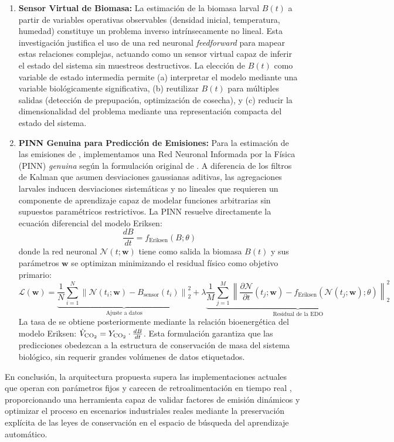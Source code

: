 \begin{enumerate}
    \item \textbf{Sensor Virtual de Biomasa:} La estimación de la biomasa larval $B(t)$ a partir de variables operativas observables (densidad inicial, temperatura, humedad) constituye un problema inverso intrínsecamente no lineal. Esta investigación justifica el uso de una red neuronal \textit{feedforward} para mapear estas relaciones complejas, actuando como un sensor virtual capaz de inferir el estado del sistema sin muestreos destructivos. La elección de $B(t)$ como variable de estado intermedia permite (a) interpretar el modelo mediante una variable biológicamente significativa, (b) reutilizar $B(t)$ para múltiples salidas (detección de prepupación, optimización de cosecha), y (c) reducir la dimensionalidad del problema mediante una representación compacta del estado del sistema.
    
    \item \textbf{PINN Genuina para Predicción de Emisiones:} Para la estimación de las emisiones de , implementamos una Red Neuronal Informada por la Física (PINN) \textit{genuina} según la formulación original de \textcite{raissiPhysicsinformedNeuralNetworks2019}. A diferencia de los filtros de Kalman que asumen desviaciones gaussianas aditivas, las agregaciones larvales inducen desviaciones sistemáticas y no lineales que requieren un componente de aprendizaje capaz de modelar funciones arbitrarias sin supuestos paramétricos restrictivos. La PINN resuelve directamente la ecuación diferencial del modelo Eriksen:
    \[
    \frac{dB}{dt} = f_{\text{Eriksen}}(B; \theta)
    \]
    donde la red neuronal $\mathcal{N}(t; \mathbf{w})$ tiene como salida la biomasa $B(t)$ y sus parámetros $\mathbf{w}$ se optimizan minimizando el residual físico como objetivo primario:
    \[
    \mathcal{L}(\mathbf{w}) = \underbrace{\frac{1}{N}\sum_{i=1}^{N} \left\| \mathcal{N}(t_i; \mathbf{w}) - B_{\text{sensor}}(t_i) \right\|_2^2}_{\text{Ajuste a datos}} + \lambda \underbrace{\frac{1}{M}\sum_{j=1}^{M} \left\| \frac{\partial \mathcal{N}}{\partial t}(t_j; \mathbf{w}) - f_{\text{Eriksen}}(\mathcal{N}(t_j; \mathbf{w}); \theta) \right\|_2^2}_{\text{Residual de la EDO}}
    \]
    La tasa de  se obtiene posteriormente mediante la relación bioenergética del modelo Eriksen: $\dot{V}_{\ce{CO2}} = Y_{\ce{CO2}} \cdot \frac{dB}{dt}$. Esta formulación garantiza que las predicciones obedezcan a la estructura de conservación de masa del sistema biológico, sin requerir grandes volúmenes de datos etiquetados.
\end{enumerate}

En conclusión, la arquitectura propuesta supera las implementaciones actuales que operan con parámetros fijos y carecen de retroalimentación en tiempo real \parencite{kamilaris2017review,liuOptimizingDataPipelines2023}, proporcionando una herramienta capaz de validar factores de emisión dinámicos y optimizar el proceso en escenarios industriales reales mediante la preservación explícita de las leyes de conservación en el espacio de búsqueda del aprendizaje automático.